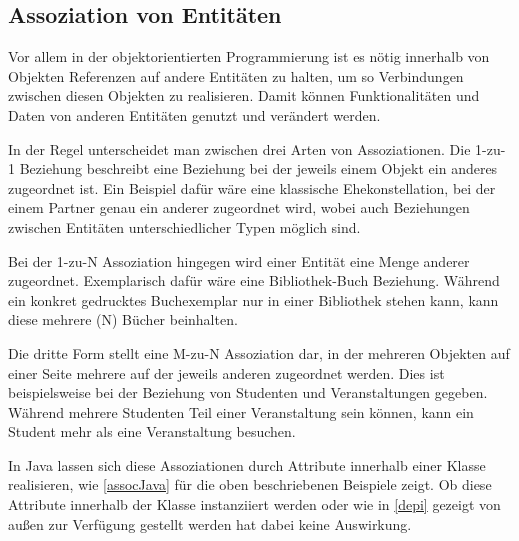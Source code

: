 \subsection{Assoziation von Entitäten}

Vor allem in der objektorientierten Programmierung ist es nötig innerhalb von Objekten Referenzen auf andere Entitäten zu halten, um so Verbindungen zwischen diesen Objekten zu realisieren. Damit können Funktionalitäten und Daten von anderen Entitäten genutzt und verändert werden. 

In der Regel unterscheidet man zwischen drei Arten von Assoziationen. Die 1-zu-1 Beziehung beschreibt eine Beziehung bei der jeweils einem Objekt ein anderes zugeordnet ist. Ein Beispiel dafür wäre eine klassische Ehekonstellation, bei der einem Partner genau ein anderer zugeordnet wird, wobei auch Beziehungen zwischen Entitäten unterschiedlicher Typen möglich sind. 

Bei der 1-zu-N Assoziation hingegen wird einer Entität eine Menge anderer zugeordnet. Exemplarisch dafür wäre eine Bibliothek-Buch Beziehung. Während ein konkret gedrucktes Buchexemplar nur in einer Bibliothek stehen kann, kann diese mehrere (N) Bücher beinhalten. 

Die dritte Form stellt eine M-zu-N Assoziation dar, in der mehreren Objekten auf einer Seite mehrere auf der jeweils anderen zugeordnet werden. Dies ist beispielsweise bei der Beziehung von Studenten und Veranstaltungen gegeben. Während mehrere Studenten Teil einer Veranstaltung sein können, kann ein Student mehr als eine Veranstaltung besuchen.


In Java lassen sich diese Assoziationen durch Attribute innerhalb einer Klasse realisieren, wie \autoref{assocJava} für die oben beschriebenen Beispiele zeigt. Ob diese Attribute innerhalb der Klasse instanziiert werden oder wie in \autoref{depi} gezeigt von außen zur Verfügung gestellt werden hat dabei keine Auswirkung.

